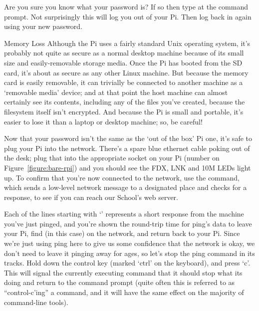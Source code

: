 Are you sure you know what your password is? If so then type  at the command prompt. Not surprisingly this will log you out of your Pi. Then log back in again using your new password. 

\begin{danger}{Memory Loss} 
Although the Pi uses a fairly standard Unix operating system, it's probably not quite as secure as a normal desktop machine because of its small size and easily-removable storage media. Once the Pi has booted from the SD card, it's about as secure as any other Linux machine. But because the memory card is easily removable, it can trivially be connected to another machine as a `removable media' device; and at that point the host machine can almost certainly see its contents, including any of the files you've created, because the filesystem itself isn't encrypted. And because the Pi is small and portable, it's easier to lose it than a laptop or desktop machine; so, be careful!
\end{danger}

Now that your password isn't the same as the `out of the box' Pi one, it's safe to plug your Pi into the network. There's a spare blue ethernet cable poking out of the desk; plug that into the appropriate socket on your Pi (number  on Figure~\ref{figure:bare-rpi}) and you should see the FDX, LNK and 10M LEDs light up. To confirm that you're now connected to the network, use the  command, which sends a low-level network message to a designated place and checks for a response, to see if you can reach our School's web server. 



Each of the lines starting with `' represents a short response from the machine you've just pinged, and you're shown the round-trip time for ping's data to leave your Pi, find (in this case)  on the network, and return back to your Pi. Since we're just using ping here to give us some confidence that the network is okay, we don't need to leave it pinging away for ages, so let's stop the ping command in its tracks. Hold down the control key (marked `ctrl' on the keyboard), and press `c'. This will signal the currently executing command that it should stop what its doing and return to the command prompt (quite often this is referred to as ``control-c'ing'' a command, and it will have the same effect on the majority of command-line tools).

